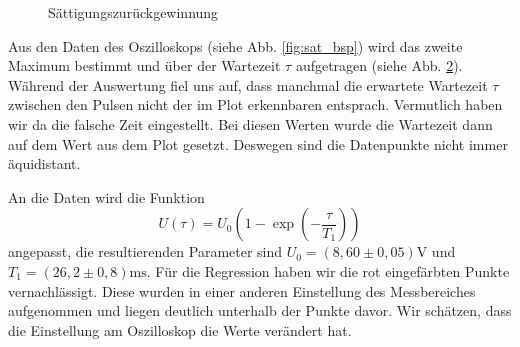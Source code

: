 \begin{figure}[h]
\begin{subfigure}[h]{0.5\textwidth}
    \label{fig:sat_data}
  \end{subfigure}
  \caption{Sättigungszurückgewinnung}
\end{figure}

Aus den Daten des Oszilloskops (siehe Abb. \ref{fig:sat_bsp}) wird das zweite Maximum bestimmt und über der Wartezeit $\tau$ aufgetragen (siehe Abb. \ref{fig:sat_data}). Während der Auswertung fiel uns auf, dass manchmal die erwartete Wartezeit $\tau$ zwischen den Pulsen nicht der im Plot erkennbaren entsprach. Vermutlich haben wir da die falsche Zeit eingestellt. Bei diesen Werten wurde die Wartezeit dann auf dem Wert aus dem Plot gesetzt. Deswegen sind die Datenpunkte nicht immer äquidistant. 

An die Daten wird die Funktion $$U(\tau) = U_0\left(1-\exp{\left(-\frac{\tau}{T_1}\right)}\right)$$ angepasst, die resultierenden Parameter sind $U_0 = (8,60\pm 0,05)\si{\volt}$ und $T_1 = (26,2\pm 0,8) \si{\milli\second}$. Für die Regression haben wir die rot eingefärbten Punkte vernachlässigt. Diese wurden in einer anderen Einstellung des Messbereiches aufgenommen und liegen deutlich unterhalb der Punkte davor. Wir schätzen, dass die Einstellung am Oszilloskop die Werte verändert hat.


